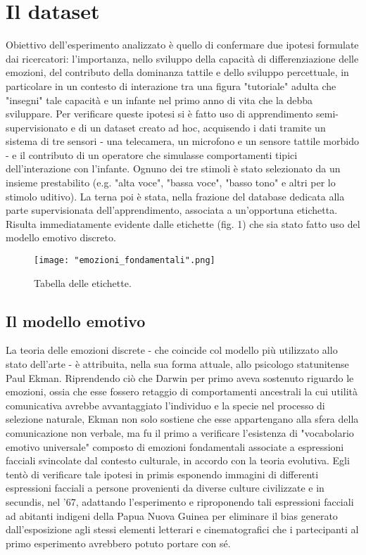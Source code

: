 \documentclass[10pt,letterpaper]{article}
\begin{document}
\section{Il dataset}
Obiettivo dell'esperimento analizzato è quello di confermare due ipotesi formulate dai ricercatori: l'importanza, nello sviluppo della capacità di differenziazione delle emozioni, del contributo della dominanza tattile e dello sviluppo percettuale, in particolare in un contesto di interazione tra una figura "tutoriale" adulta che "insegni" tale capacità e un infante nel primo anno di vita che la debba sviluppare. Per verificare queste ipotesi si è fatto uso di apprendimento semi-supervisionato e di un dataset creato ad hoc, acquisendo i dati tramite un sistema di tre sensori - una telecamera, un microfono e un sensore tattile morbido - e il contributo di un operatore che simulasse comportamenti tipici dell'interazione con l'infante. Ognuno dei tre stimoli è stato selezionato da un insieme prestabilito (e.g. "alta voce", "bassa voce", "basso tono" e altri per lo stimolo uditivo). La terna poi è stata, nella frazione del database dedicata alla parte supervisionata dell'apprendimento, associata a un'opportuna etichetta. Risulta immediatamente evidente dalle etichette (fig. 1) che sia stato fatto uso del modello emotivo discreto.
\newpage
\begin{figure}[h!]
	\centering
	\texttt{[image: "emozioni\_fondamentali".png]}
	\caption{Tabella delle etichette.}
	\label{fig:screen1}
\end{figure}

\subsection{Il modello emotivo}
La teoria delle emozioni discrete - che coincide col modello più utilizzato allo stato dell'arte - è attribuita, nella sua forma attuale, allo psicologo statunitense Paul Ekman. Riprendendo ciò che Darwin per primo aveva sostenuto riguardo le emozioni, ossia che esse fossero retaggio di comportamenti ancestrali la cui utilità comunicativa avrebbe avvantaggiato l'individuo e la specie nel processo di selezione naturale, Ekman non solo sostiene che esse appartengano alla sfera della comunicazione non verbale, ma fu il primo a verificare l'esistenza di "vocabolario emotivo universale" composto di emozioni fondamentali associate a espressioni facciali svincolate dal contesto culturale, in accordo con la teoria evolutiva.  Egli tentò di verificare tale ipotesi in primis esponendo immagini di differenti espressioni facciali a persone provenienti da diverse culture civilizzate e in secundis, nel '67, adattando l'esperimento e riproponendo tali espressioni facciali ad abitanti indigeni della Papua Nuova Guinea per eliminare il bias generato dall'esposizione agli stessi elementi letterari e cinematografici che i partecipanti al primo esperimento avrebbero potuto portare con sé.
\end{document}
